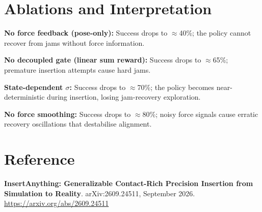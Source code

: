 \documentclass[10pt,twocolumn]{article}
\begin{document}
\section{Ablations and Interpretation}

\textbf{No force feedback (pose-only):} Success drops to $\approx$40\%;
the policy cannot recover from jams without force information.

\textbf{No decoupled gate (linear sum reward):} Success drops to
$\approx$65\%; premature insertion attempts cause hard jams.

\textbf{State-dependent $\sigma$:} Success drops to $\approx$70\%; the
policy becomes near-deterministic during insertion, losing jam-recovery
exploration.

\textbf{No force smoothing:} Success drops to $\approx$80\%; noisy force
signals cause erratic recovery oscillations that destabilise alignment.

\section*{Reference}

\textbf{InsertAnything: Generalizable Contact-Rich Precision Insertion
from Simulation to Reality}.
arXiv:2609.24511, September 2026.\\
\url{https://arxiv.org/abs/2609.24511}
\end{document}

